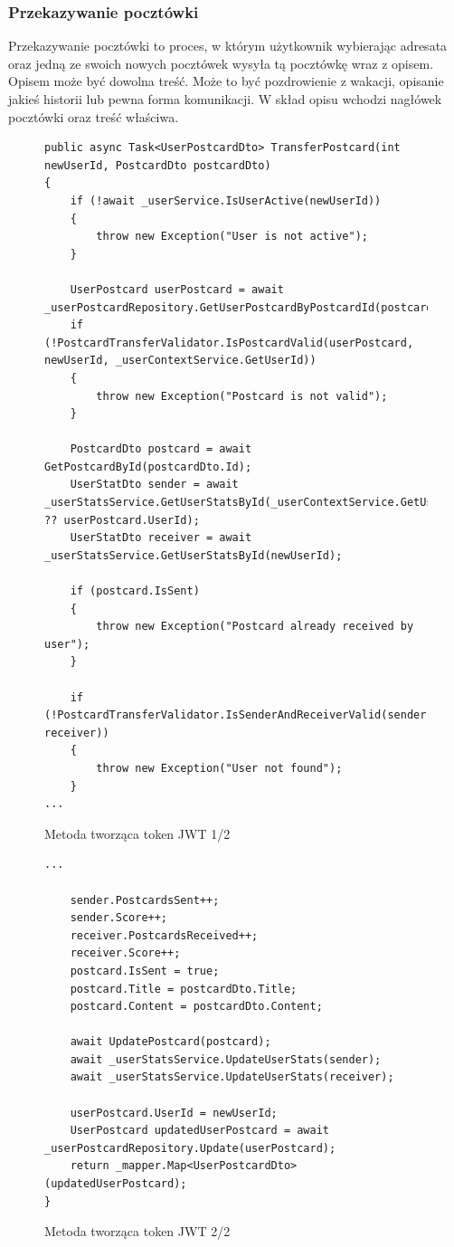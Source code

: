 \documentclass[a4paper,twoside,12pt]{book}
\begin{document}
\subsubsection{Przekazywanie pocztówki}
Przekazywanie pocztówki to proces, w którym użytkownik wybierając adresata oraz jedną ze swoich nowych pocztówek wysyła tą pocztówkę wraz z opisem. Opisem może być dowolna treść. Może to być pozdrowienie z wakacji, opisanie jakieś historii lub pewna forma komunikacji. W skład opisu wchodzi nagłówek pocztówki oraz treść właściwa. 

        \begin{figure}[H]
        \begin{lstlisting}
public async Task<UserPostcardDto> TransferPostcard(int newUserId, PostcardDto postcardDto)
{
    if (!await _userService.IsUserActive(newUserId))
    {
        throw new Exception("User is not active");
    }

    UserPostcard userPostcard = await _userPostcardRepository.GetUserPostcardByPostcardId(postcardDto.Id);
    if (!PostcardTransferValidator.IsPostcardValid(userPostcard, newUserId, _userContextService.GetUserId))
    {
        throw new Exception("Postcard is not valid");
    }

    PostcardDto postcard = await GetPostcardById(postcardDto.Id);
    UserStatDto sender = await _userStatsService.GetUserStatsById(_userContextService.GetUserId ?? userPostcard.UserId);
    UserStatDto receiver = await _userStatsService.GetUserStatsById(newUserId);

    if (postcard.IsSent)
    {
        throw new Exception("Postcard already received by user");
    }

    if (!PostcardTransferValidator.IsSenderAndReceiverValid(sender, receiver))
    {
        throw new Exception("User not found");
    }
...
        \end{lstlisting}
    \caption{Metoda tworząca token JWT 1/2}
    \label{fig:pseudokod:listings}
    \end{figure}

    \begin{figure}[H]
        \begin{lstlisting}
...
        
    sender.PostcardsSent++;
    sender.Score++;
    receiver.PostcardsReceived++;
    receiver.Score++;
    postcard.IsSent = true;
    postcard.Title = postcardDto.Title;
    postcard.Content = postcardDto.Content;

    await UpdatePostcard(postcard);
    await _userStatsService.UpdateUserStats(sender);
    await _userStatsService.UpdateUserStats(receiver);

    userPostcard.UserId = newUserId;
    UserPostcard updatedUserPostcard = await _userPostcardRepository.Update(userPostcard);
    return _mapper.Map<UserPostcardDto>(updatedUserPostcard);
}
        \end{lstlisting}
    \caption{Metoda tworząca token JWT 2/2}
    \label{fig:pseudokod:listings}
    \end{figure}
\end{document}
